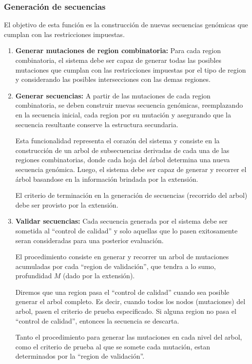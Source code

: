\documentclass[10pt,a4paper]{article}
\begin{document}
  \subsubsection{Generaci\'on de secuencias}
  El objetivo de esta funci\'on es la construcci\'on de nuevas secuencias gen\'omicas que cumplan con las restricciones impuestas.
  \begin{enumerate}
    \item \textbf{Generar mutaciones de region combinatoria:}
    Para cada region combinatoria, el sistema debe ser capaz de generar todas las posibles mutaciones que cumplan con las restricciones impuestas por el tipo de region y considerando las posibles intersecciones con las demas regiones.
    
    \item \textbf{Generar secuencias:}
    A partir de las mutaciones de cada region combinatoria, se deben construir nuevas secuencia gen\'omicas, reemplazando en la secuencia inicial, cada region por su mutaci\'on y asegurando que la secuencia resultante conserve la estructura secundaria.

    Esta funcionalidad representa el coraz\'on del sistema y consiste en la construcci\'on de un arbol de subsecuencias derivadas de cada una de las regiones combinatorias, donde cada hoja del \'arbol determina una nueva secuencia gen\'omica. Luego, el sistema debe ser capaz de generar y recorrer el \'arbol basandose en la informaci\'on brindada por la extensi\'on.

    El criterio de terminaci\'on en la generaci\'on de secuencias (recorrido del arbol) debe ser provisto por la extensi\'on.

    \item \textbf{Validar secuencias:}
    Cada secuencia generada por el sistema debe ser sometida al ``control de calidad'' y solo aquellas que lo pasen exitosamente seran consideradas para una posterior evaluaci\'on.    

    El procedimiento consiste en generar y recorrer un arbol de mutaciones acumuladas por cada ``region de validaci\'on'', que tendra a lo sumo, profundidad $M$ (dado por la extensi\'on). 

    Diremos que una region pasa el ``control de calidad'' cuando sea posible generar el arbol completo. Es decir, cuando todos los nodos (mutaciones) del arbol, pasen el criterio de prueba especificado. Si alguna region no pasa el ``control de calidad'', entonces la secuencia se descarta.

    Tanto el procedimiento para generar las mutaciones en cada nivel del arbol, como el criterio de prueba al que se somete cada mutaci\'on, estan determinados por la ``region de validaci\'on''.
  \end{enumerate}
\end{document}
